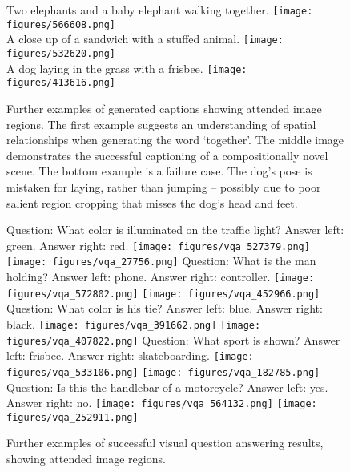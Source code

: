 \documentclass[10pt,twocolumn,letterpaper]{article}
\begin{document}
\begin{figure*}[t]
	\begin{center}
		Two elephants and a baby elephant walking together.
		\texttt{[image: figures/566608.png]}\\
		A close up of a sandwich with a stuffed animal.
		\texttt{[image: figures/532620.png]}\\
		A dog laying in the grass with a frisbee.
		\texttt{[image: figures/413616.png]}\\
	\end{center}
	\caption{Further examples of generated captions showing attended image regions. The first example suggests an understanding of spatial relationships when generating the word `together'. The middle image demonstrates the successful captioning of a compositionally novel scene. The bottom example is a failure case. The dog's pose is mistaken for laying, rather than jumping -- possibly due to poor salient region cropping that misses the dog's head and feet.}
	\label{fig:extra}
\end{figure*}

\begin{figure*}[t]
	\begin{center}
		Question: What color is illuminated on the traffic light?
		Answer left: green. Answer right: red.
		\texttt{[image: figures/vqa\_527379.png]}
		\texttt{[image: figures/vqa\_27756.png]}
		Question: What is the man holding?
		Answer left: phone. Answer right: controller.
		\texttt{[image: figures/vqa\_572802.png]}
		\texttt{[image: figures/vqa\_452966.png]}
		Question: What color is his tie?
		Answer left: blue. Answer right: black.
		\texttt{[image: figures/vqa\_391662.png]}
		\texttt{[image: figures/vqa\_407822.png]}
		Question: What sport is shown?
		Answer left: frisbee. Answer right: skateboarding.
		\texttt{[image: figures/vqa\_533106.png]}
		\texttt{[image: figures/vqa\_182785.png]}
		Question: Is this the handlebar of a motorcycle?
		Answer left: yes. Answer right: no.
		\texttt{[image: figures/vqa\_564132.png]}
		\texttt{[image: figures/vqa\_252911.png]}
	\end{center}
	\caption{Further examples of successful visual question answering results, showing attended image regions. }
	\label{fig:vqa_examples}
\end{figure*}
\end{document}
